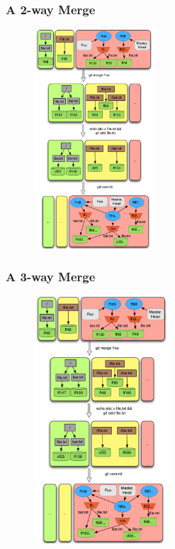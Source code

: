 \documentclass{beamer}
\begin{document}
\begin{frame}[fragile]
   \frametitle{A 2-way Merge}
   \begin{figure}
      \centering
      \includegraphics[width=0.40\textwidth]{images/merge2way.png}
   \end{figure}
\end{frame}

\begin{frame}[fragile]
   \frametitle{A 3-way Merge}
   \begin{figure}
      \centering
      \includegraphics[width=0.45\textwidth]{images/merge2way.png}
   \end{figure}
\end{frame}
\end{document}
